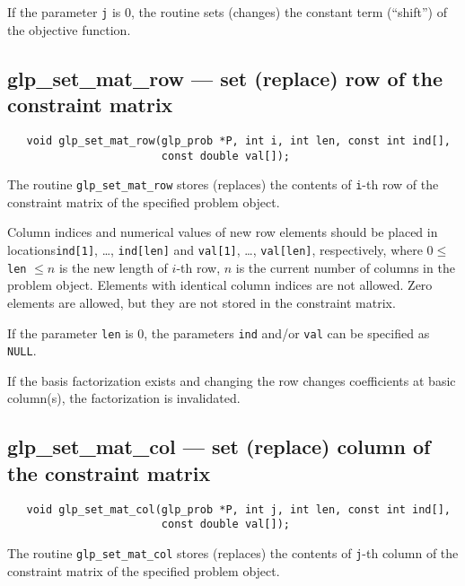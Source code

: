 If the parameter \verb|j| is 0, the routine sets (changes) the constant
term (``shift'') of the objective function.

\subsection{glp\_set\_mat\_row --- set (replace) row of the constraint
matrix}

\synopsis

\begin{verbatim}
   void glp_set_mat_row(glp_prob *P, int i, int len, const int ind[],
                        const double val[]);
\end{verbatim}

\description

The routine \verb|glp_set_mat_row| stores (replaces) the contents of
\verb|i|-th row of the constraint matrix of the specified problem
object.

Column indices and numerical values of new row elements should be
placed in locations\linebreak \verb|ind[1]|, \dots, \verb|ind[len]| and
\verb|val[1]|, \dots, \verb|val[len]|, respectively, where
$0 \leq$ \verb|len| $\leq n$ is the new length of $i$-th row, $n$ is
the current number of columns in the problem object. Elements with
identical column indices are not allowed. Zero elements are allowed,
but they are not stored in the constraint matrix.

If the parameter \verb|len| is 0, the parameters \verb|ind| and/or
\verb|val| can be specified as \verb|NULL|.

\note

If the basis factorization exists and changing the row changes
coefficients at basic column(s), the factorization is invalidated.

\subsection{glp\_set\_mat\_col --- set (replace) column of the
constr\-aint matrix}

\synopsis

\begin{verbatim}
   void glp_set_mat_col(glp_prob *P, int j, int len, const int ind[],
                        const double val[]);
\end{verbatim}

\description

The routine \verb|glp_set_mat_col| stores (replaces) the contents of
\verb|j|-th column of the constraint matrix of the specified problem
object.

